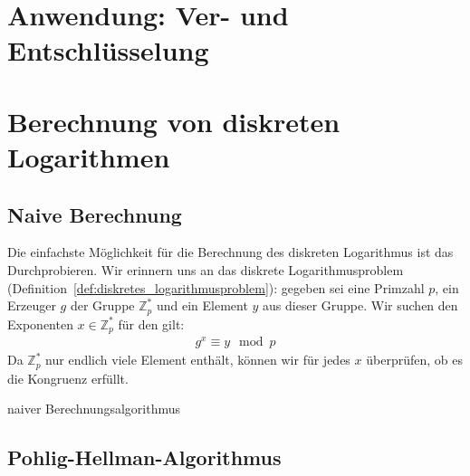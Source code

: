 \documentclass[
  a4paper,
  11pt,
]{scrartcl}
\theoremstyle{plain}
\theoremstyle{definition}
\theoremstyle{remark}
\newcommand{\Z}{\mathbb{Z}}
\renewcommand{\P}{\mathbb{P}}
\begin{document}
\section{Anwendung: Ver- und Entschlüsselung}
\label{sec:anwendung_ver_und_entschlusselung}

\section{Berechnung von diskreten Logarithmen}
\label{sec:berechnung_von_diskreten_logarithmen}

\subsection{Naive Berechnung}
\label{sub:naive_berechnung}

Die einfachste Möglichkeit für die Berechnung des diskreten Logarithmus ist das
Durchprobieren. Wir erinnern uns an das diskrete Logarithmusproblem
(Definition~\ref{def:diskretes_logarithmusproblem}): gegeben sei eine Primzahl
$p$, ein Erzeuger $g$ der Gruppe $\Z_p^*$ und ein Element $y$ aus dieser Gruppe.
Wir suchen den Exponenten $x \in \Z_p^*$ für den gilt:
\begin{align*}
  g^x \equiv y \mod p
\end{align*}
Da $\Z_p^*$ nur endlich viele Element enthält, können wir für jedes $x$
überprüfen, ob es die Kongruenz erfüllt.

\begin{algorithm}
  \caption{naiver Berechnungsalgorithmus}
  \begin{algorithmic}
    \REQUIRE{$p \in \P, \left\langle g \right\rangle \in \Z_p^*, y \in \Z_p^*$}
      \ELSE{}
      \ENDIF{}
    \ENDFOR{}
  \end{algorithmic}
\end{algorithm}


\subsection{Pohlig-Hellman-Algorithmus}
\label{sub:pohlig_hellman_algorithmus}
\end{document}
